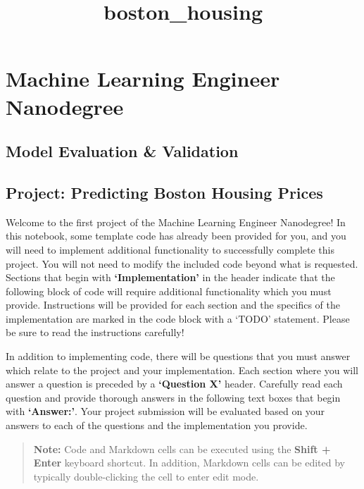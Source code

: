 \documentclass[11pt]{article}
\title{boston\_housing}
\begin{document}
    
    
    \maketitle
    
    

    
    \hypertarget{machine-learning-engineer-nanodegree}{%
\section{Machine Learning Engineer
Nanodegree}\label{machine-learning-engineer-nanodegree}}

\hypertarget{model-evaluation-validation}{%
\subsection{Model Evaluation \&
Validation}\label{model-evaluation-validation}}

\hypertarget{project-predicting-boston-housing-prices}{%
\subsection{Project: Predicting Boston Housing
Prices}\label{project-predicting-boston-housing-prices}}

Welcome to the first project of the Machine Learning Engineer
Nanodegree! In this notebook, some template code has already been
provided for you, and you will need to implement additional
functionality to successfully complete this project. You will not need
to modify the included code beyond what is requested. Sections that
begin with \textbf{`Implementation'} in the header indicate that the
following block of code will require additional functionality which you
must provide. Instructions will be provided for each section and the
specifics of the implementation are marked in the code block with a
`TODO' statement. Please be sure to read the instructions carefully!

In addition to implementing code, there will be questions that you must
answer which relate to the project and your implementation. Each section
where you will answer a question is preceded by a \textbf{`Question X'}
header. Carefully read each question and provide thorough answers in the
following text boxes that begin with \textbf{`Answer:'}. Your project
submission will be evaluated based on your answers to each of the
questions and the implementation you provide.

\begin{quote}
\textbf{Note:} Code and Markdown cells can be executed using the
\textbf{Shift + Enter} keyboard shortcut. In addition, Markdown cells
can be edited by typically double-clicking the cell to enter edit mode.
\end{quote}
\end{document}

